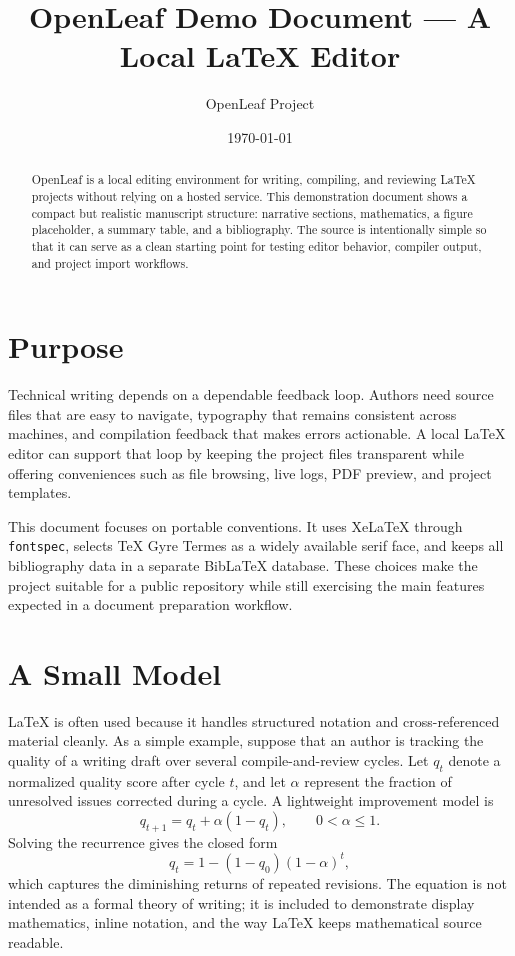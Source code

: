 \documentclass[11pt]{article}
\title{OpenLeaf Demo Document — A Local LaTeX Editor}
\author{OpenLeaf Project}
\date{\today}
\begin{document}
\maketitle

\begin{abstract}
OpenLeaf is a local editing environment for writing, compiling, and reviewing
LaTeX projects without relying on a hosted service. This demonstration document
shows a compact but realistic manuscript structure: narrative sections,
mathematics, a figure placeholder, a summary table, and a bibliography. The
source is intentionally simple so that it can serve as a clean starting point
for testing editor behavior, compiler output, and project import workflows.
\end{abstract}

\section{Purpose}

Technical writing depends on a dependable feedback loop. Authors need source
files that are easy to navigate, typography that remains consistent across
machines, and compilation feedback that makes errors actionable. A local LaTeX
editor can support that loop by keeping the project files transparent while
offering conveniences such as file browsing, live logs, PDF preview, and project
templates.

This document focuses on portable conventions. It uses XeLaTeX through
\texttt{fontspec}, selects TeX Gyre Termes as a widely available serif face, and
keeps all bibliography data in a separate BibLaTeX database. These choices make
the project suitable for a public repository while still exercising the main
features expected in a document preparation workflow.

\section{A Small Model}

LaTeX is often used because it handles structured notation and cross-referenced
material cleanly. As a simple example, suppose that an author is tracking the
quality of a writing draft over several compile-and-review cycles. Let
\(q_t\) denote a normalized quality score after cycle \(t\), and let
\(\alpha\) represent the fraction of unresolved issues corrected during a
cycle. A lightweight improvement model is
\begin{equation}
  q_{t+1} = q_t + \alpha (1 - q_t),
  \qquad 0 < \alpha \leq 1.
\end{equation}
Solving the recurrence gives the closed form
\begin{equation}
  q_t = 1 - (1 - q_0)(1 - \alpha)^t,
\end{equation}
which captures the diminishing returns of repeated revisions. The equation is
not intended as a formal theory of writing; it is included to demonstrate
display mathematics, inline notation, and the way LaTeX keeps mathematical
source readable.
\end{document}
